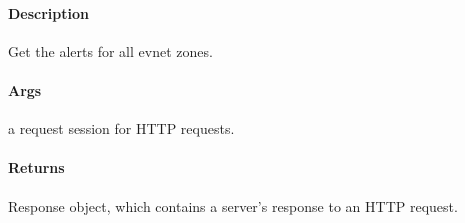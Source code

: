 \documentclass[letterpaper,10pt,english]{sphinxmanual}
\begin{document}

\begin{fulllineitems}
\label{\detokenize{gemini_lidar_hub_API:gemini_lidar_hub_API.get_lidar_hub_event_alerts}}
\pysigstartsignatures
{}
\pysigstopsignatures

\paragraph{Description}
\label{\detokenize{gemini_lidar_hub_API:id14}}
\sphinxAtStartPar
Get the alerts for all evnet zones.


\paragraph{Args}
\label{\detokenize{gemini_lidar_hub_API:id15}}\begin{description}
\sphinxAtStartPar
a request session for HTTP requests.

\end{description}


\paragraph{Returns}
\label{\detokenize{gemini_lidar_hub_API:id16}}\begin{description}
\sphinxAtStartPar
Response object, which contains a server’s response to an HTTP request.

\end{description}

\end{fulllineitems}

\end{document}
